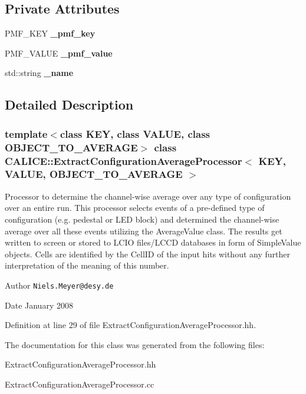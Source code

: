 \subsection*{Private Attributes}
\begin{DoxyCompactItemize}
\item 
PMF\_\-KEY {\bfseries \_\-pmf\_\-key}\label{classCALICE_1_1ExtractConfigurationAverageProcessor_a8b33481b90291e374ba3386bc462f378}

\item 
PMF\_\-VALUE {\bfseries \_\-pmf\_\-value}\label{classCALICE_1_1ExtractConfigurationAverageProcessor_a2b24536049c82fd0cbebaee159683451}

\item 
std::string {\bfseries \_\-name}\label{classCALICE_1_1ExtractConfigurationAverageProcessor_adc1336d4d2336e11746598d496e53f7e}

\end{DoxyCompactItemize}


\subsection{Detailed Description}
\subsubsection*{template$<$class KEY, class VALUE, class OBJECT\_\-TO\_\-AVERAGE$>$ class CALICE::ExtractConfigurationAverageProcessor$<$ KEY, VALUE, OBJECT\_\-TO\_\-AVERAGE $>$}

Processor to determine the channel-\/wise average over any type of configuration over an entire run. This processor selects events of a pre-\/defined type of configuration (e.g. pedestal or LED block) and determined the channel-\/wise average over all these events utilizing the AverageValue class. The results get written to screen or stored to LCIO files/LCCD databases in form of SimpleValue objects. Cells are identified by the CellID of the input hits without any further interpretation of the meaning of this number.

\begin{DoxyAuthor}{Author}
{\tt Niels.Meyer@desy.de} 
\end{DoxyAuthor}
\begin{DoxyDate}{Date}
January 2008 
\end{DoxyDate}


Definition at line 29 of file ExtractConfigurationAverageProcessor.hh.

The documentation for this class was generated from the following files:\begin{DoxyCompactItemize}
\item 
ExtractConfigurationAverageProcessor.hh\item 
ExtractConfigurationAverageProcessor.cc\end{DoxyCompactItemize}
